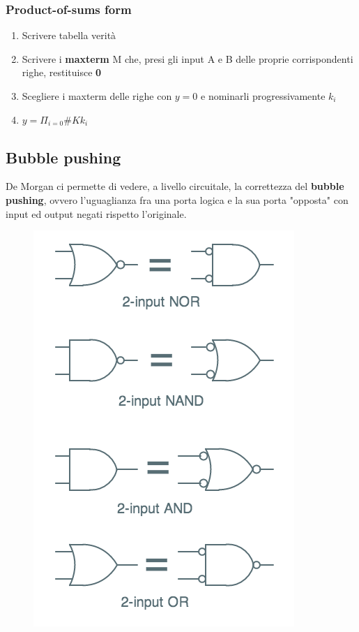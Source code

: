 \documentclass{report}
\begin{document}
        \subsubsection{Product-of-sums form}
        \begin{enumerate}
            \item Scrivere tabella verità
            \item Scrivere i \textbf{maxterm} M che, presi gli input A e B delle
            proprie corrispondenti righe, restituisce \textbf{0}
            \item Scegliere i maxterm delle righe con $y=0$ e nominarli progressivamente $k_i$
            \item $y = \Pi_{i=0}{\#K}k_i$
        \end{enumerate}
    \subsection{Bubble pushing}
        De Morgan ci permette di vedere, a livello circuitale, la correttezza 
        del \textbf{bubble pushing}, ovvero l'uguaglianza fra una porta logica e 
        la sua porta "opposta" con input ed output negati rispetto l'originale.
        \begin{center}
            \begin{figure}[H]
                \includegraphics[width=\textwidth]{bubblepushing.png}
            \end{figure}
        \end{center}  
\end{document}
